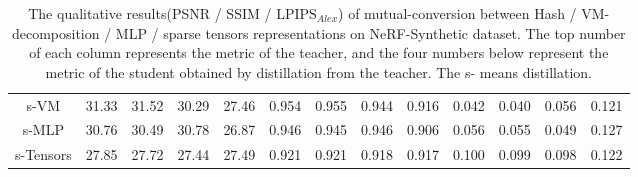 \documentclass[letterpaper]{article} \usepackage{aaai23}  \usepackage{times}  \usepackage{helvet}  \usepackage{courier}  \usepackage[hyphens]{url}  \usepackage{graphicx} \urlstyle{rm} \def\UrlFont{\rm}  \usepackage{natbib}  \usepackage{caption} \frenchspacing  \setlength{\pdfpagewidth}{8.5in}  \setlength{\pdfpageheight}{11in}  \usepackage{multirow}
\begin{document}
\begin{table*}[t]
\begin{tabular}{c|cccccccccccc}
s-VM                       & 31.33                                                & 31.52                                              & 30.29                                               & \multicolumn{1}{c|}{27.46}                                                  & 0.954                                                & 0.955                                              & 0.944                                               & \multicolumn{1}{c|}{0.916}                                                  & 0.042                                                & 0.040                                              & 0.056                                               & 0.121                                                  \\
s-MLP                      & 30.76                                                & 30.49                                              & 30.78                                               & \multicolumn{1}{c|}{26.87}                                                  & 0.946                                                & 0.945                                              & 0.946                                               & \multicolumn{1}{c|}{0.906}                                                  & 0.056                                                & 0.055                                              & 0.049                                               & 0.127                                                  \\
s-Tensors                   & 27.85                                                & 27.72                                              & 27.44                                               & \multicolumn{1}{c|}{27.49}                                                  & 0.921                                                & 0.921                                              & 0.918                                               & \multicolumn{1}{c|}{0.917}                                                  & 0.100                                                & 0.099                                              & 0.098                                               & 0.122                                                  \\ \hline
\end{tabular}
\caption{The qualitative results(PSNR / SSIM / $\text{LPIPS}_{Alex}$) of mutual-conversion between Hash / VM-decomposition / MLP / sparse tensors representations on NeRF-Synthetic dataset. The top number of each column represents the metric of the teacher, and the four numbers below represent the metric of the student obtained by distillation from the teacher. The s- means distillation.}
\label{table-mutual}
\end{table*}
\end{document}
